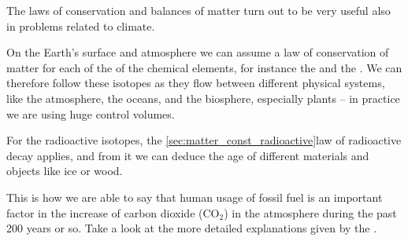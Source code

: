 \label{nsec:cons_matter_climate}

The laws of conservation and balances of matter turn out to be very useful also in problems related to climate.

On the Earth's surface and atmosphere we can assume a law of conservation of matter for each of the  of the chemical elements, for instance the  and the . We can therefore follow these isotopes as they flow between different physical systems, like the atmosphere, the oceans, and the biosphere, especially plants -- in practice we are using huge control volumes.

For the radioactive isotopes, the \autoref{sec:matter_const_radioactive}{law of radioactive decay} applies, and from it we can deduce the age of different materials and objects like ice or wood.

This is how we are able to say that human usage of fossil fuel is an important factor in the increase of carbon dioxide ($\mathrm{CO_{2}}$) in the atmosphere during the past 200 years or so. Take a look at the more detailed explanations given by the .

